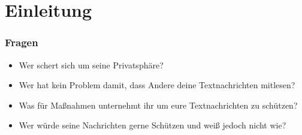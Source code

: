 \section{Einleitung}

\begin{frame}
  \frametitle{Fragen}

  \begin{itemize}
   \item Wer schert sich um seine Privatsphäre?
   \item Wer hat kein Problem damit, dass Andere deine Textnachrichten mitlesen?
   \item Was für Maßnahmen unternehmt ihr um eure Textnachrichten zu schützen?
   \item Wer würde seine Nachrichten gerne Schützen und weiß jedoch nicht wie?
  \end{itemize}

\end{frame}


